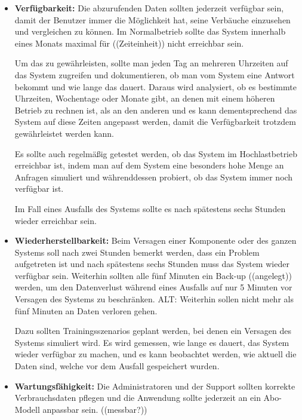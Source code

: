 
\begin{itemize}
    \item \textbf{Verfügbarkeit: }
    Die abzurufenden Daten sollten jederzeit verfügbar sein,
    damit der Benutzer immer die Möglichkeit hat, 
    seine Verbäuche einzusehen und vergleichen zu können.
    Im Normalbetrieb sollte das System innerhalb eines Monats maximal für ((Zeiteinheit)) nicht erreichbar sein.
    
    Um das zu gewährleisten, sollte man jeden Tag an mehreren Uhrzeiten auf das System zugreifen
    und dokumentieren, ob man vom System eine Antwort bekommt und wie lange das dauert. 
    Daraus wird analysiert, ob es bestimmte Uhrzeiten, Wochentage oder Monate gibt, 
    an denen mit einem höheren Betrieb zu rechnen ist, als an den anderen und es kann dementsprechend das
    System auf diese Zeiten angepasst werden, damit die Verfügbarkeit trotzdem gewährleistet werden kann. 
   
    Es sollte auch regelmäßig getestet werden, ob das System im Hochlastbetrieb erreichbar ist, 
    indem man auf dem System eine besonders hohe Menge an Anfragen simuliert und währenddessen probiert,
    ob das System immer noch verfügbar ist. 
    
    Im Fall eines Ausfalls des Systems sollte es nach spätestens sechs Stunden wieder erreichbar sein.

    \item \textbf{Wiederherstellbarkeit: }
    Beim Versagen einer Komponente oder des ganzen Systems soll nach zwei Stunden bemerkt werden, 
    dass ein Problem aufgetreten ist und nach spätestens sechs Stunden muss das System wieder verfügbar sein.
    Weiterhin sollten alle fünf Minuten ein Back-up ((angelegt)) werden, um den Datenverlust während eines Ausfalls
    auf nur 5 Minuten vor Versagen des Systems zu beschränken. 
    ALT: Weiterhin sollen nicht mehr als fünf Minuten an Daten verloren gehen.
    
    Dazu sollten Trainingsszenarios geplant werden, bei denen ein Versagen des Systems simuliert wird. 
    Es wird gemessen, wie lange es dauert, das System wieder verfügbar zu machen, und es kann beobachtet werden,
    wie aktuell die Daten sind, welche vor dem Ausfall gespeichert wurden. 
    
  
    \item \textbf{Wartungsfähigkeit: }
    Die Administratoren und der Support sollten korrekte Verbrauchsdaten 
    pflegen und die Anwendung sollte jederzeit an ein Abo-Modell anpassbar sein.
    ((messbar?))
    

\end{itemize}
